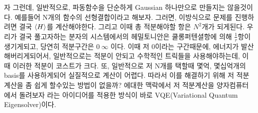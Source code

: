\documentclass[11pt]{article}
\begin{document}
\begin{enumerate}[label=2)]
자 그런데, 일반적으로, 파동함수을 단순하게 Gaussian 하나만으로 만들지는 않을것이다. 
예를들어 N개의 함수의 선형결합이라고 해보자. 
그러면, 이방식으로 문제를 진행하려면 결국 \(\langle H \rangle \\\)를 계산해야한다. 그리고 이때 총 적분해야할 항은 \(N^2\)개가 되게된다. 
우리가 결국 풀고자하는 분자의 시스템에서의 헤밀토니안은 쿨롱퍼텐셜항에 의해 \(\frac{1}{r}\)항이 생기게되고, 당연히 적분구간은 \(0~\infty\) 이다. 
이때 저 0이라는 구간때문에, 에너지가 발산해버리게되어서, 일반적으로는 적분이 안되고 수학적인 트릭들을 사용해야하는데, 이때 이러한 적분이 코스트가 크다. 
또, 일반적으로 저 N개를 택할때 몇억, 몇십억개의 basis를 사용하게되어 실질적으로 계산이 어렵다. 
따라서 이를 해결하기 위해 저 적분계산을 좀 쉽게 할수있는 방법이 없을까? 에대한 맥락에서 저 적분계산을 양자컴퓨터에서 돌려보자 라는 아이디어를 적용한 방식이 바로 VQE(Variational Quantum Eigensolver)이다. 

\vspace{\baselineskip}
\end{enumerate}
\end{document}
